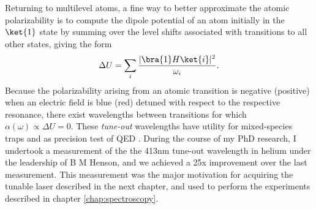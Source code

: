 Returning to multilevel atoms, a fine way to better approximate the atomic polarizability is to compute the dipole potential of an atom initially in the $\ket{1}$ state by summing over the level shifts associated with transitions to all other states, giving the form
	\begin{equation}
		\Delta U = \sum_i \frac{|\bra{1}H\ket{i}|^2}{\omega_i}.
	\end{equation}
	Because the polarizability arising from an atomic transition is negative (positive) when an electric field is blue (red) detuned with respect to the respective resonance, there exist wavelengths between transitions for which $\alpha(\omega)\propto\Delta U = 0$.
	These \emph{tune-out} wavelengths have utility for mixed-species traps and as precision test of QED \cite{Henson15,Mitroy13,TOforthcoming}.
	During the course of my PhD research, I undertook a measurement of the the 413nm tune-out wavelength in helium under the leadership of B M Henson, and we achieved a 25x improvement over the last measurement.
	This measurement was the major motivation for acquiring the tunable laser described in the next chapter, and used to perform the experiments described in chapter \ref{chap:spectroscopy}.